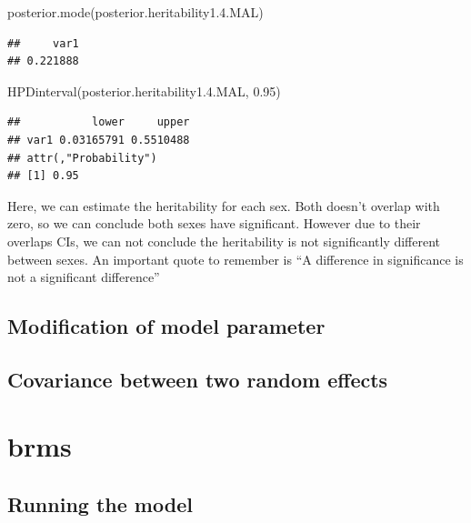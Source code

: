 \documentclass[
  12pt,
]{book}
\newenvironment{Shaded}{\begin{snugshade}}{\end{snugshade}}
\newcommand{\FloatTok}[1]{\textcolor[rgb]{0.00,0.00,0.81}{#1}}
\newcommand{\FunctionTok}[1]{\textcolor[rgb]{0.00,0.00,0.00}{#1}}
\newcommand{\NormalTok}[1]{#1}
\begin{document}
\begin{Shaded}
\begin{Highlighting}[]
\FunctionTok{posterior.mode}\NormalTok{(posterior.heritability1.}\FloatTok{4.}\NormalTok{MAL)}
\end{Highlighting}
\end{Shaded}

\begin{verbatim}
##     var1 
## 0.221888
\end{verbatim}

\begin{Shaded}
\begin{Highlighting}[]
\FunctionTok{HPDinterval}\NormalTok{(posterior.heritability1.}\FloatTok{4.}\NormalTok{MAL, }\FloatTok{0.95}\NormalTok{)}
\end{Highlighting}
\end{Shaded}

\begin{verbatim}
##           lower     upper
## var1 0.03165791 0.5510488
## attr(,"Probability")
## [1] 0.95
\end{verbatim}

Here, we can estimate the heritability for each sex. Both doesn't overlap with zero, so we can conclude both sexes have significant. However due to their overlaps CIs, we can not conclude the heritability is not significantly different between sexes.
An important quote to remember is ``A difference in significance is not a significant difference''

\hypertarget{modification-of-model-parameter-1}{%
\subsection{Modification of model parameter}\label{modification-of-model-parameter-1}}

\hypertarget{covariance-between-two-random-effects-1}{%
\subsection{Covariance between two random effects}\label{covariance-between-two-random-effects-1}}

\hypertarget{brms-1}{%
\section{brms}\label{brms-1}}

\hypertarget{running-the-model-2}{%
\subsection{Running the model}\label{running-the-model-2}}
\end{document}
